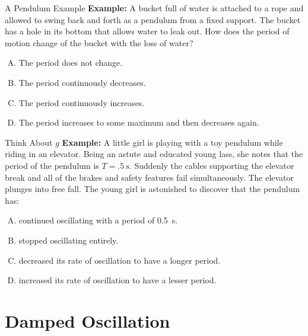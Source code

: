 \documentclass[12pt,compress,aspectratio=169]{beamer}
\begin{document}
\begin{frame}{A Pendulum Example}
  \textbf{Example:} A bucket full of water is attached to a rope and allowed
  to swing back and forth as a pendulum from a fixed support. The bucket has a
  hole in its bottom that allows water to leak out. How does the period of
  motion change of the bucket with the loss of water?
  \begin{enumerate}[(A)]
  \item The period does not change.
  \item The period continuously decreases.
  \item The period continuously increases.
  \item The period increases to some maximum and then decreases again.
  \end{enumerate}
\end{frame}



\begin{frame}{Think About $g$}
  \textbf{Example:} A little girl is playing with a toy pendulum while riding
  in an elevator. Being an astute and educated young lass, she notes that the 
  period of the pendulum is $T=\SI{.5}\second$. Suddenly the cables
  supporting the elevator break and all  of the brakes and safety features fail
  simultaneously. The elevator plunges into free fall. The young girl is
  astonished to discover that the pendulum has:
  \begin{enumerate}[(A)]
  \item continued oscillating with a period of \SI{.5}\second.
  \item stopped oscillating entirely.
  \item decreased its rate of oscillation to have a longer period.
  \item increased its rate of oscillation to have a lesser period.
  \end{enumerate}
\end{frame}



\section{Damped Oscillation}
\end{document}
